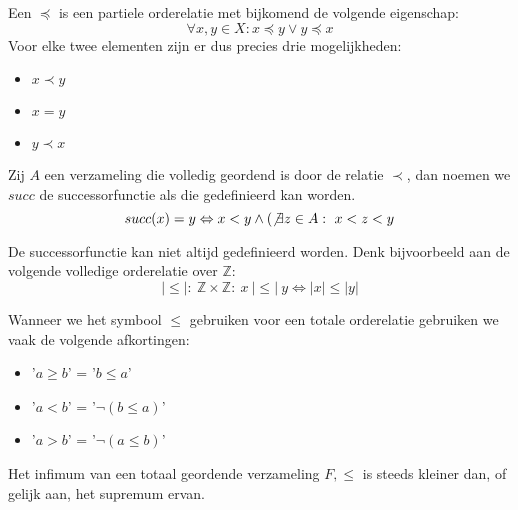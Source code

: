 \documentclass[main.tex]{subfiles}
\begin{document}
\begin{de}
  Een  $\preceq$ is een partiele orderelatie met bijkomend de volgende eigenschap:
  \[ \forall x,y \in X: x \preceq y \vee y \preceq x \]
  Voor elke twee elementen zijn er dus precies drie mogelijkheden:
  \begin{itemize}
  \item $x \prec y$
  \item $x = y$
  \item $y \prec x$
  \end{itemize}
\end{de}

\begin{de}
  Zij $A$ een verzameling die volledig geordend is door de relatie $\prec$, dan noemen we $succ$ de successorfunctie als die gedefinieerd kan worden.
  \[ succ(x) = y \Leftrightarrow x < y \wedge (\not\exists z \in A:\ x < z < y \]
\end{de}

\begin{opm}
  De successorfunctie kan niet altijd gedefinieerd worden.
  Denk bijvoorbeeld aan de volgende volledige orderelatie over $\mathbb{Z}$:
  \[ |\le|:\ \mathbb{Z} \times \mathbb{Z}:\ x\ |\le|\ y \Leftrightarrow |x| \le |y| \]
\end{opm}

\begin{de}
  Wanneer we het symbool $\le$ gebruiken voor een totale orderelatie gebruiken we vaak de volgende afkortingen:
  \begin{itemize}
  \item '$a \ge b$' = '$b \le a$'
  \item '$a < b$' = '$\neg(b \le a)$'
  \item '$a > b$' = '$\neg(a \le b)$'
  \end{itemize}
\end{de}

\begin{st}
  \label{st:infimum-kleiner-dan-supremum}
  Het infimum van een totaal geordende verzameling $F,\le$ is steeds kleiner dan, of gelijk aan, het supremum ervan.
\end{st}
\end{document}
